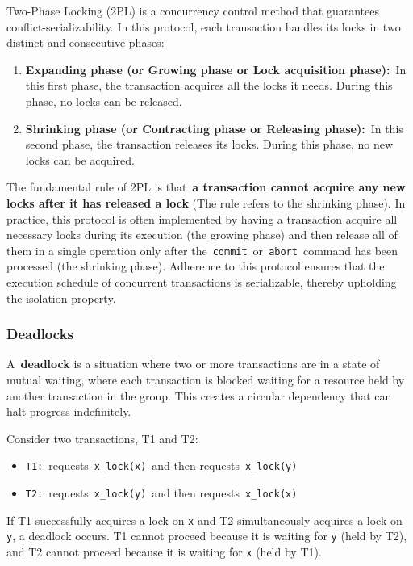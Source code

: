 \documentclass{scrbook}
\begin{document}
Two-Phase Locking (2PL) is a concurrency control method that guarantees
conflict-serializability. In this protocol, each transaction handles its
locks in two distinct and consecutive phases:

\begin{enumerate}
\item
  \textbf{Expanding phase (or Growing phase or Lock acquisition
  phase):}~In this first phase, the transaction acquires all the locks
  it needs. During this phase, no locks can be released.
\item
  \textbf{Shrinking phase (or Contracting phase or Releasing phase):}~In
  this second phase, the transaction releases its locks. During this
  phase, no new locks can be acquired.
\end{enumerate}

The fundamental rule of 2PL is that~\textbf{a transaction cannot acquire
any new locks after it has released a lock} (The rule refers to the
shrinking phase). In practice, this protocol is often implemented by
having a transaction acquire all necessary locks during its execution
(the growing phase) and then release all of them in a single operation
only after the~\texttt{commit}~or~\texttt{abort}~command has been
processed (the shrinking phase). Adherence to this protocol ensures that
the execution schedule of concurrent transactions is serializable,
thereby upholding the isolation property.

\subsubsection{Deadlocks}

A~\textbf{deadlock} is a situation where two or more transactions are in
a state of mutual waiting, where each transaction is blocked waiting for
a resource held by another transaction in the group. This creates a
circular dependency that can halt progress indefinitely.

Consider two transactions, T1 and T2:

\begin{itemize}
\item
  \texttt{T1:}~requests~\texttt{x\_lock(x)}~and then
  requests~\texttt{x\_lock(y)}
\item
  \texttt{T2:}~requests~\texttt{x\_lock(y)}~and then
  requests~\texttt{x\_lock(x)}
\end{itemize}

If T1 successfully acquires a lock on \texttt{x} and T2 simultaneously
acquires a lock on \texttt{y}, a deadlock occurs. T1 cannot proceed
because it is waiting for \texttt{y} (held by T2), and T2 cannot proceed
because it is waiting for \texttt{x} (held by T1).
\end{document}
